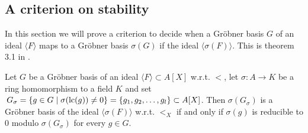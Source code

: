 \subsection{A criterion on stability}
In this section we will prove a criterion to decide when a Gröbner basis $G$ of an ideal $\langle F \rangle$ maps to a Gröbner basis $\sigma(G)$ if the ideal $\langle \sigma(F) \rangle$. This is theorem 3.1 in \cite{Kalkbrener}.

\begin{lemma}\label{lem:grb_iff_reduc_to_z}
  Let $G$ be a Gröbner basis of an ideal $\langle F \rangle \subset A[X]$ w.r.t. $<$, let $\sigma : A \to K$ be a ring homomorphism to a field $K$ and set $\,G_{\sigma} = \{g \in G \mid \sigma(\operatorname{lc}(g)) \neq 0\} = \{g_{1}, g_{2}, \dots, g_{l}\} \subset A[X]$. Then $\sigma(G_{\sigma})$ is a Gröbner basis of the ideal $\langle \sigma(F) \rangle$ w.r.t. $<_{X}$ if and only if $\sigma(g)$ is reducible to 0 modulo $\sigma(G_{\sigma})$ for every $g \in G$.
\end{lemma}
